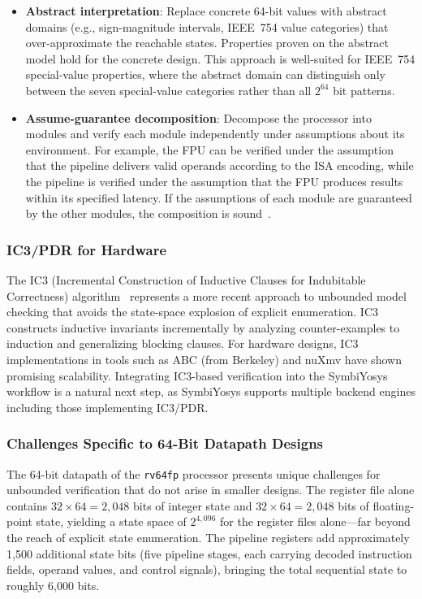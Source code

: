 \documentclass[journal]{IEEEtran}
\begin{document}
\begin{itemize}[leftmargin=*]
\item \textbf{Abstract interpretation}: Replace concrete 64-bit values
      with abstract domains (e.g., sign-magnitude intervals, IEEE~754
      value categories) that over-approximate the reachable states.
      Properties proven on the abstract model hold for the concrete
      design.  This approach is well-suited for IEEE~754 special-value
      properties, where the abstract domain can distinguish only between
      the seven special-value categories rather than all $2^{64}$ bit
      patterns.
\item \textbf{Assume-guarantee decomposition}: Decompose the processor
      into modules and verify each module independently under
      assumptions about its environment.  For example, the FPU can be
      verified under the assumption that the pipeline delivers valid
      operands according to the ISA encoding, while the pipeline is
      verified under the assumption that the FPU produces results
      within its specified latency.  If the assumptions of each module
      are guaranteed by the other modules, the composition is
      sound~\cite{mcmillan2003interpolation}.
\end{itemize}

\subsubsection{IC3/PDR for Hardware}
The IC3 (Incremental Construction of Inductive Clauses for
Indubitable Correctness) algorithm~\cite{bradley2011ic3} represents a
more recent approach to unbounded model checking that avoids the
state-space explosion of explicit enumeration.  IC3 constructs inductive
invariants incrementally by analyzing counter-examples to induction and
generalizing blocking clauses.  For hardware designs, IC3 implementations
in tools such as ABC (from Berkeley) and nuXmv have shown promising
scalability.  Integrating IC3-based verification into the SymbiYosys
workflow is a natural next step, as SymbiYosys supports multiple
backend engines including those implementing IC3/PDR.

\subsubsection{Challenges Specific to 64-Bit Datapath Designs}
The 64-bit datapath of the \texttt{rv64fp} processor presents unique
challenges for unbounded verification that do not arise in smaller
designs.  The register file alone contains $32 \times 64 = 2{,}048$ bits
of integer state and $32 \times 64 = 2{,}048$ bits of floating-point
state, yielding a state space of $2^{4{,}096}$ for the register files
alone---far beyond the reach of explicit state enumeration.  The
pipeline registers add approximately 1,500 additional state bits (five
pipeline stages, each carrying decoded instruction fields, operand
values, and control signals), bringing the total sequential state to
roughly 6,000 bits.
\end{document}
